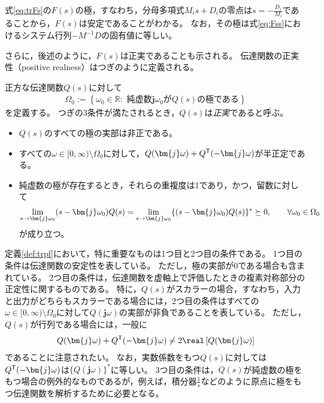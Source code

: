 \documentclass[tombow,dvipdfmx]{corona-a5}
\begin{document}
式\ref{eq:trFs}の$F(s)$の極，すなわち，分母多項式$M_i s + D_i$の零点は$s=-\frac{D_i}{M_i}$であることから，$F(s)$は安定であることがわかる。
なお，その極は式\ref{eq:Fss}におけるシステム行列$-M^{-1}D$の固有値に等しい。

さらに，後述のように，$F(s)$は正実であることも示される。
伝達関数の正実性（positive realness）はつぎのように定義される。

\begin{定義}[伝達関数の正実性]\label{def:trpf}
正方な伝達関数$Q(s)$に対して
\begin{align}\label{eq:defOm0}
\Omega_0 := \left\{
\omega_0 \in \mathbb{R}: 
\mbox{ 純虚数$\bm{j} \omega_0$が$Q(s)$の極である}
\right\}
\end{align}
を定義する。
つぎの3条件が満たされるとき，$Q(s)$は\emph{正実}であると呼ぶ。
\begin{itemize}
\item $Q(s)$のすべての極の実部は非正である。
\item すべての$\omega \in [0,\infty)\setminus \Omega_0$に対して，$Q(\bm{j} \omega) + Q^{\sf T}(-\bm{j} \omega)$が半正定である。
\item 純虚数の極が存在するとき，それらの重複度は1であり，かつ，留数に対して
\begin{align*}
\lim_{s \rightarrow \bm{j} \omega_0} (s-\bm{j} \omega_0) Q(s) = \lim_{s\rightarrow \bm{j} \omega_0} \{ (s-\bm{j} \omega_0) Q(s)\}^{\sf *}\succeq 0
,\qquad
\forall \omega_0 \in \Omega_0
\end{align*}
が成り立つ。
\end{itemize}
\end{定義}

定義\ref{def:trpf}において，特に重要なものは1つ目と2つ目の条件である。
1つ目の条件は伝達関数の安定性を表している。
ただし，極の実部が0である場合も含まれている。
2つ目の条件は，伝達関数を虚軸上で評価したときの複素対称部分の正定性に関するものである。
特に，$Q(s)$がスカラーの場合，すなわち，入力と出力がどちらもスカラーである場合には，2つ目の条件はすべての$\omega \in [0,\infty)\setminus \Omega_0$に対して$Q(\bm{j}\omega)$の実部が非負であることを表している。
ただし，$Q(s)$が行列である場合には，一般に
\begin{align*}
Q(\bm{j} \omega) + Q^{\sf T}(-\bm{j} \omega) \neq 2 \real\left[ Q(\bm{j} \omega) \right]
\end{align*}
であることに注意されたい。
なお，実数係数をもつ$Q(s)$に対しては$Q^{\sf T}( -\bm{j} \omega)$は$\{Q(\bm{j} \omega)\}^*$に等しい。
3つ目の条件は，$Q(s)$が純虚数の極をもつ場合の例外的なものであるが，例えば，積分器$\frac{1}{s}$などのように原点に極をもつ伝達関数を解析するために必要となる。
\end{document}
